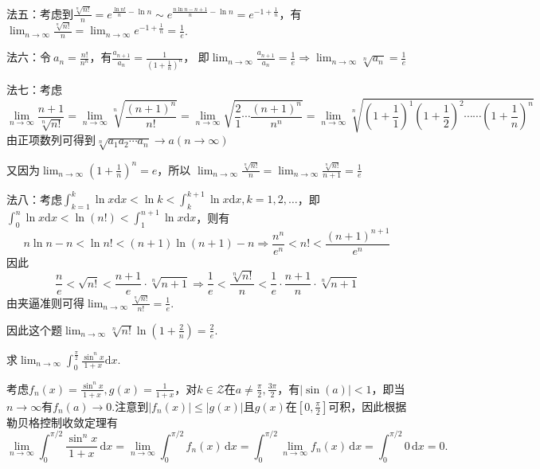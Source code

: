\begin{xiti}
\begin{solution}
\begin{enumerate}
	法五：考虑到$\frac{\sqrt[n]{n!}}{n}=e^{\frac{\ln n!}{n}-\ln n}\sim e^{\frac{n\ln n-n+1}{n}-\ln n}=e^{-1+\frac{1}{n}}$，有$\lim_{n\rightarrow\infty}\frac{\sqrt[n]{n!}}{n}=\lim_{n\rightarrow\infty}e^{-1+\frac{1}{n}}=\frac{1}{e}$.
	
	法六：令$\ a_n=\frac{n!}{n^n}$，有$\frac{a_{n+1}}{a_n}=\frac{1}{\left(1+\frac{1}{n}\right)^n}
	$，
	即$\lim_{n\rightarrow\infty}\frac{a_{n+1}}{a_n}=\frac{1}{e}\Rightarrow \lim_{n\rightarrow\infty}\sqrt[n]{a_n}=\frac{1}{e}$
	
	法七：考虑
	\[
	\lim_{n\rightarrow\infty}\frac{n+1}{\sqrt[n]{n!}}=\lim_{n\rightarrow\infty}\sqrt[n]{\frac{\left(n+1\right)^n}{n!}}=\lim_{n\rightarrow\infty}\sqrt{\frac{2}{1}\cdots\frac{\left(n+1\right)^n}{n^n}}=\lim_{n\rightarrow\infty}\sqrt[n]{\left(1+\frac{1}{1}\right)^1\left(1+\frac{1}{2}\right)^2\cdots\cdots\left(1+\frac{1}{n}\right)^n}
	\]
	由正项数列可得到$\sqrt[n]{a_1a_2\cdots a_n}\longrightarrow a\left(n\rightarrow\infty\right)$
	
	又因为$\lim_{n\rightarrow\infty}\left(1+\frac{1}{n}\right)^n=e$，所以
	$
	\lim_{n\rightarrow\infty}\frac{\sqrt[n]{n!}}{n}=\lim_{n\rightarrow\infty}\frac{\sqrt[n]{n!}}{n+1}=\frac{1}{e}
	$
	
	法八：考虑$
	\int_{k=1}^{k} \ln x \mathrm { d } x<\ln k<\int_{k}^{k+1} \ln x \mathrm { d }x,  k=1,2, \ldots$，即$\int_{0}^{n} \ln x \mathrm { d } x<\ln (n !)<\int_{1}^{n+1} \ln x \mathrm { d } x$，则有
	\[
	n \ln n-n<\ln n !<(n+1) \ln (n+1)-n\Rightarrow
	\frac{n^{n}}{e^{n}}<n !<\frac{(n+1)^{n+1}}{e^{n}}
	\]
	因此
	\[
	\frac{n}{e}<\sqrt{n !}<\frac{n+1}{e} \cdot \sqrt[n]{n+1}\Rightarrow\frac{1}{e}<\frac{\sqrt[n]{n !}}{n}<\frac{1}{e} \cdot \frac{n+1}{n} \cdot \sqrt[n]{n+1}
	\]
	由夹逼准则可得$\lim _{n \rightarrow \infty} \frac{\sqrt[n]{n !}}{n !}=\frac{1}{e}$.
	\end{enumerate}
\end{solution}
\begin{note}
	因此这个题$\lim _ { n \rightarrow \infty } \sqrt [ n ] { n ! } \ln \left( 1 + \frac { 2 } { n } \right)=\frac{2}{e}$.
\end{note}
\item 求$\lim _ { n \rightarrow \infty } \int _ { 0 } ^ { \frac { \pi } { 2 } } \frac { \sin ^ { n } x } { 1 + x } \mathrm { d } x$.
\begin{solution}
	考虑$f_n\left(x\right)=\frac{\sin^nx}{1+x},g\left(x\right)=\frac{1}{1+x}$，对$k\in \mathcal{Z}$在$a\ne \frac{\pi}{2},\frac{3\pi}{2}$，有$|\sin(a)| < 1$，即当$n\rightarrow \infty$有$f_n (a) \to 0$.注意到$|f_n (x)| \le |g(x)|$且$g(x)$在$[0,\frac{\pi}{2}]$可积，因此根据勒贝格控制收敛定理有
	\[
	\lim_{n\rightarrow\infty}\int_0^{\pi/2}{\frac{\sin^nx}{1+x}}\,\mathrm { d }x=\lim_{n\rightarrow\infty}\int_0^{\pi/2}{f_n}\left(x\right)\,\mathrm { d }x=\int_0^{\pi/2}{\lim_{n\rightarrow\infty}}f_n\left(x\right)\,\mathrm { d }x=\int_0^{\pi/2}{0}\,\mathrm { d }x=0.
	\]
	

\end{solution}
\end{xiti}
